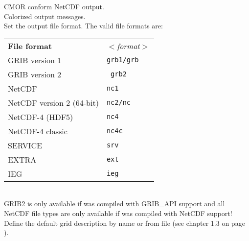 \begin{tabbing}
         \> CMOR conform NetCDF output. \\
         \> Colorized output messages. \\
         \> Set the output file format. The valid file formats are: \\
         \> \parbox[r]{3in}{
              \vspace*{1mm}
              \hspace*{0cm}\begin{tabular}{|l|l|}
              \hline
              \rowcolor{pcolor2}
              \textbf{File format}          & \textsl{$<$format$>$}\\
               GRIB version 1            & \texttt{grb1/grb}  \\
               GRIB version 2            & \texttt{ grb2} \\
               NetCDF                    & \texttt{nc1}   \\
               NetCDF version 2 (64-bit) & \texttt{nc2/nc}  \\
               NetCDF-4 (HDF5)           & \texttt{nc4}  \\
               NetCDF-4 classic          & \texttt{nc4c} \\
               SERVICE                   & \texttt{srv}  \\
               EXTRA                     & \texttt{ext}  \\
               IEG                       & \texttt{ieg}  \\
              \hline
              \end{tabular}
              \vspace*{1mm}
            } \\
         \> GRIB2 is only available if {\CDO} was compiled with GRIB\_API support and all \\
         \> NetCDF file types are only available if {\CDO} was compiled with NetCDF support! \\
         \> Define the default grid description by name or from file (see chapter 1.3 on page \pageref{GRID_DESCRIPTION}). \\

\end{tabbing}
